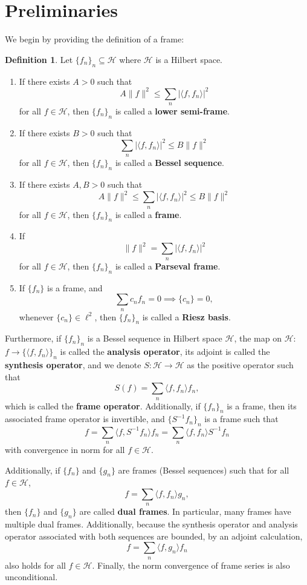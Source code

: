 \documentclass[11pt]{amsart}
\theoremstyle{definition}
\newtheorem{def_n}[thm]{Definition}
\numberwithin{equation}{section}
\newcommand{\Hcal}{\mathcal{H}} %
\begin{document}
\section{Preliminaries}
We begin by providing the definition of a frame:
\begin{def_n}
Let $\{f_{n}\}_{n}\subseteq \Hcal$ where $\Hcal$ is a Hilbert space.
\begin{enumerate}
\item If there exists $A>0$ such that
$$A\|f\|^{2}\leq \sum_{n}|\langle f, f_{n}\rangle|^{2}$$
for all $f\in \Hcal$, then $\{f_{n}\}_{n}$ is called a \textbf{lower semi-frame}.
\item If there exists $B>0$ such that
$$\sum_{n}|\langle f, f_{n}\rangle|^{2}\leq B\|f\|^{2}$$
for all $f\in \Hcal$, then $\{f_{n}\}_{n}$ is called a \textbf{Bessel sequence}.
\item If there exists $A,B>0$ such that
    $$A\|f\|^{2}\leq \sum_{n}|\langle f, f_{n}\rangle|^{2}\leq B\|f\|^{2}$$
    for all $f\in \Hcal$, then $\{f_{n}\}_{n}$ is called a \textbf{frame}.
\item If
$$\|f\|^{2}=\sum_{n}|\langle f, f_{n}\rangle|^{2}$$
for all $f\in \Hcal$, then $\{f_{n}\}_{n}$ is called a \textbf{Parseval frame}.
\item If $\{f_{n}\}$ is a frame, and
$$\sum_{n}c_{n}f_{n}=0\implies \{c_{n}\}=0,$$
whenever $\{c_{n}\}\in \ell^{2}$,
then $\{f_{n}\}_{n}$ is called a \textbf{Riesz basis}.
\end{enumerate}
Furthermore, if $\{f_{n}\}_{n}$ is a Bessel sequence in Hilbert space $\Hcal$,
the map on $\Hcal$: $f\to \{\langle f, f_{n}\rangle \}_{n}$ is called the \textbf{analysis operator}, its adjoint is called the \textbf{synthesis operator}, and 
we denote $S: \Hcal\to \Hcal$ as the positive operator such that
$$S(f)=\sum_{n}\langle f, f_{n}\rangle f_{n},$$ which is called the \textbf{frame operator}.
Additionally, if $\{f_{n}\}_{n}$ is a frame, then its associated frame operator is invertible, and $\{S^{-1}f_{n}\}_{n}$ is a frame such that
$$f=\sum_{n}\langle f, S^{-1}f_{n}\rangle f_{n}=\sum_{n}\langle f, f_{n}\rangle S^{-1}f_{n}$$ with convergence in norm for all $f\in \Hcal$.

Additionally, if $\{f_{n}\}$ and $\{g_{n}\}$ are frames (Bessel sequences) such that for all $f\in \Hcal$,
$$f=\sum_{n}\langle f, f_{n}\rangle g_{n},$$ then $\{f_{n}\}$ and $\{g_{n}\}$ are called \textbf{dual frames}. In particular, many frames have multiple dual frames. Additionally, because the synthesis operator and analysis operator associated with both sequences are bounded, by an adjoint calculation, 
$$f=\sum_{n}\langle f,g_{n}\rangle f_{n}$$ also holds for all $f\in \Hcal$. Finally, the norm convergence of frame series is also unconditional.
\end{def_n}
\end{document}
